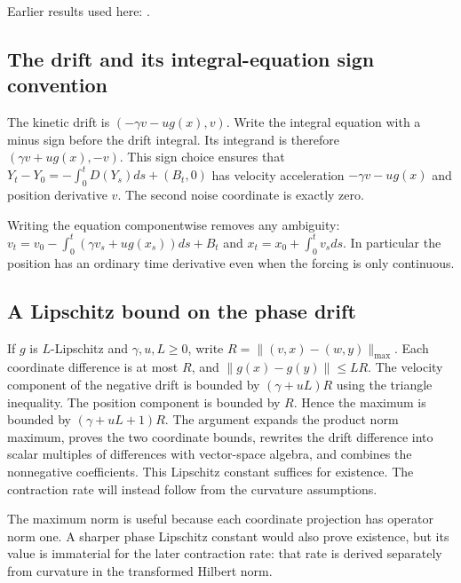 \documentclass[11pt,a4paper]{report}
\begin{document}
Earlier results used here: \cite[Section~3.14]{LangevinLean2026ULASC}.
\subsection{\texorpdfstring{The drift and its integral-equation sign convention}{The drift and its integral-equation sign convention}}
\label{report-step-KineticLangevin-Dynamics-lean-1}


The kinetic drift is \((-\gamma v-ug(x),v)\). Write the integral equation with a minus sign before the drift integral. Its integrand is therefore \((\gamma v+ug(x),-v)\). This sign choice ensures that \(Y_t-Y_0=-\int_0^tD(Y_s)ds+(B_t,0)\) has velocity acceleration \(-\gamma v-ug(x)\) and position derivative \(v\). The second noise coordinate is exactly zero.



Writing the equation componentwise removes any ambiguity: \(v_t=v_0-\int_0^t(\gamma v_s+ug(x_s))ds+B_t\) and \(x_t=x_0+\int_0^tv_sds\). In particular the position has an ordinary time derivative even when the forcing is only continuous.

\subsection{\texorpdfstring{A Lipschitz bound on the phase drift}{A Lipschitz bound on the phase drift}}
\label{report-step-KineticLangevin-Dynamics-lean-2}


If \(g\) is \(L\)-Lipschitz and \(\gamma,u,L\ge0\), write \(R=\|(v,x)-(w,y)\|_{\max}\). Each coordinate difference is at most \(R\), and \(\|g(x)-g(y)\|\le LR\). The velocity component of the negative drift is bounded by \((\gamma+uL)R\) using the triangle inequality. The position component is bounded by \(R\). Hence the maximum is bounded by \((\gamma+uL+1)R\). The argument expands the product norm maximum, proves the two coordinate bounds, rewrites the drift difference into scalar multiples of differences with vector-space algebra, and combines the nonnegative coefficients. This Lipschitz constant suffices for existence. The contraction rate will instead follow from the curvature assumptions.



The maximum norm is useful because each coordinate projection has operator norm one. A sharper phase Lipschitz constant would also prove existence, but its value is immaterial for the later contraction rate: that rate is derived separately from curvature in the transformed Hilbert norm.
\end{document}
